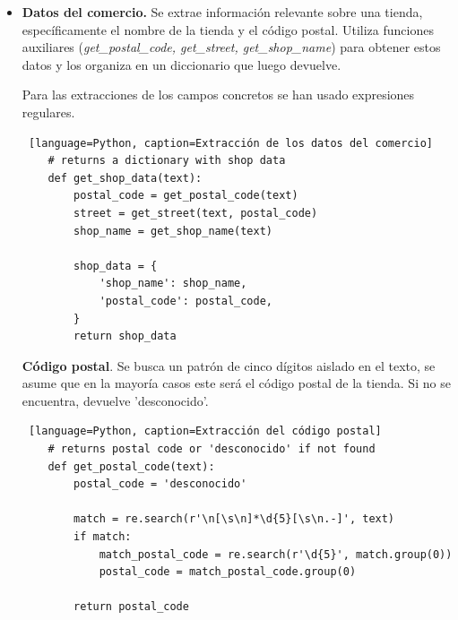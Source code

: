 \begin{itemize}
    \begin{lstlisting} [language=Python, caption=Extracción la fecha en un ticket]
    # returns date with dd/mm/aaaa format o 'desconocido' if not found
    def get_date(text):
        date = 'desconocido'
        text = text.replace(' ', '')

        date = get_date_dd_mm_yyyy(text)
        if date == 'desconocido':
            date = get_date_dd_mm_yy(text)   
            if date == 'desconocido':
                date = get_date_yyyy_mm_dd(text)

        return date
    \end{lstlisting}

    \item \textbf{Datos del comercio.} Se extrae información relevante sobre una tienda, específicamente el nombre de la tienda y el código postal. Utiliza funciones auxiliares (\textit{get\_postal\_code, get\_street, get\_shop\_name}) para obtener estos datos y los organiza en un diccionario que luego devuelve.
    
    Para las extracciones de los campos concretos se han usado expresiones regulares.  

    \begin{lstlisting} [language=Python, caption=Extracción de los datos del comercio]
    # returns a dictionary with shop data
    def get_shop_data(text):
        postal_code = get_postal_code(text)
        street = get_street(text, postal_code)
        shop_name = get_shop_name(text)

        shop_data = {
            'shop_name': shop_name,
            'postal_code': postal_code,
        }
        return shop_data
    \end{lstlisting}

\subitem \textbf{Código postal}. Se busca un patrón de cinco dígitos aislado en el texto, se asume que en la mayoría casos este será el código postal de la tienda. Si no se encuentra, devuelve 'desconocido'. \label{item:codigo_postal}
    \begin{lstlisting} [language=Python, caption=Extracción del código postal]
    # returns postal code or 'desconocido' if not found
    def get_postal_code(text):
        postal_code = 'desconocido'

        match = re.search(r'\n[\s\n]*\d{5}[\s\n.-]', text)
        if match:
            match_postal_code = re.search(r'\d{5}', match.group(0))
            postal_code = match_postal_code.group(0)

        return postal_code
    \end{lstlisting}



\end{itemize}
